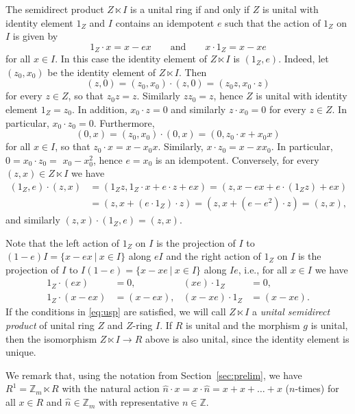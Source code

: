 \documentclass[12pt,a4paper]{amsart}
\theoremstyle{definition}
\newcommand{\Z}{\mathbb{Z}}
\begin{document}
The semidirect product $Z \ltimes I$ is a unital ring if and only if $Z$ is unital with identity element $1_Z$ and $I$ contains an idempotent $e$ such that the action of $1_Z$ on $I$ is given by
\begin{equation}\label{eq:usp}
    1_Z \cdot x=x-ex \qquad\text{and}\qquad x \cdot 1_Z=x-xe
\end{equation}
for all $x \in I$. In this case the identity element of $Z \ltimes I$ is $(1_Z,e)$.
Indeed, let $(z_0,x_0)$ be the identity element of $Z \ltimes I$. Then
$$(z,0)=(z_0,x_0) \cdot (z,0)=(z_0z,x_0\cdot z)$$
for every $z \in Z$, so that $z_0z=z$. Similarly $zz_0=z$, hence $Z$ is unital with identity element $1_Z=z_0$.
In addition, $x_0 \cdot z=0$ and similarly $z \cdot x_0=0$ for every $z \in Z$. In particular, $x_0 \cdot z_0=0$.
Furthermore,
$$(0,x)=(z_0,x_0)\cdot (0,x)=(0,z_0 \cdot x+x_0x)$$
for all $x \in I$, so that $z_0 \cdot x=x-x_0x$. Similarly, $x \cdot z_0=x-xx_0$.
In particular, $0 = x_0 \cdot z_0 =$ $x_0 - x_0^2$, hence $e=x_0$ is an idempotent.
Conversely, for every $(z,x) \in Z \ltimes I$ we have
\begin{align*}
(1_Z,e) \cdot (z,x) &=(1_Z z,1_Z \cdot x+e\cdot z+ex)=(z,x-ex+e\cdot (1_Z z)+ex)\\
&=(z,x+(e \cdot 1_Z)\cdot z)=(z,x+(e-e^2)\cdot z)=(z,x),
\end{align*}
and similarly $(z,x) \cdot (1_Z,e)= (z,x)$.

Note that the left action of $1_Z$ on $I$ is the projection of $I$ to $(1-e)I=\{x-ex ~|~ x \in I\}$ along $eI$ and the right action of $1_Z$ on $I$ is the projection of $I$ to $I(1-e)=\{x-xe ~|~ x \in I\}$ along $Ie$, i.e., for all $x \in I$ we have
\begin{align*}
   && 1_Z \cdot (ex) &=0, &  (xe) \cdot 1_Z &=0, &&\\
   && 1_Z \cdot (x-ex) &= (x-ex), & (x-xe) \cdot 1_Z &= (x-xe). &&
\end{align*}
If the conditions in \eqref{eq:usp} are satisfied, we will call $Z \ltimes I$ a \emph{unital semidirect product} of unital ring $Z$ and $Z$-ring $I$.
If $R$ is unital and the morphism $g$ is unital, then the isomorphism $Z \ltimes I \to R$ above is also unital, since the identity element is unique.

We remark that, using the notation from Section~\ref{sec:prelim}, we have $R^1 =\Z_m \ltimes R$ with the natural action $\hat{n} \cdot x=x \cdot \hat{n}=x+x+\ldots+x$ ($n$-times) for all $x \in R$ and $\hat{n} \in \Z_m$ with representative $n\in \Z$. 
\end{document}
